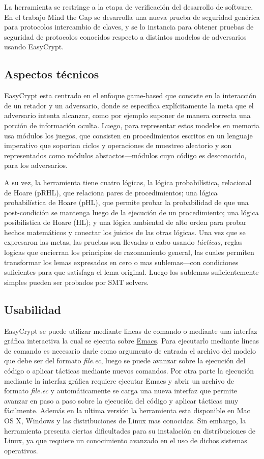 \documentclass[runningheads]{llncs}
\begin{document}
La herramienta se restringe a la etapa de verificación del desarrollo de software. En el trabajo Mind the Gap\cite{ref_article2} se desarrolla una nueva prueba de seguridad genérica para protocolos intercambio de claves, y se lo instancia para obtener pruebas de seguridad de protocolos conocidos respecto a distintos modelos de adversarios usando EasyCrypt.

\subsection{Aspectos técnicos}

EasyCrypt esta centrado en el enfoque game-based que consiste en la interacción de un retador y un adversario, donde se especifica explícitamente la meta que el adversario intenta alcanzar, como por ejemplo suponer de manera correcta una porción de información oculta. Luego, para representar estos modelos en memoria usa módulos los juegos, que consisten en procedimientos escritos en un lenguaje imperativo que soportan ciclos y operaciones de muestreo aleatorio y son representados como módulos abstactos—módulos cuyo código es desconocido, para los adversarios.

A su vez, la herramienta tiene cuatro lógicas, la lógica probabilística, relacional de Hoare (pRHL), que relaciona pares de procedimientos; una lógica probabilística de Hoare (pHL), que permite probar la probabilidad de que una post-condición se mantenga luego de la ejecución de un procedimiento; una lógica posibilistica de Hoare (HL); y una lógica ambiental de alto orden para probar hechos matemáticos y conectar los juicios de las otras lógicas. Una vez que se expresaron las metas, las pruebas son llevadas a cabo usando \textit{tácticas}, reglas logicas que encierran los principios de razonamiento general, las cuales permiten transformar los lemas expresados en cero o mas sublemas—con condiciones suficientes para que satisfaga el lema original. Luego los sublemas suficientemente simples pueden ser probados por SMT solvers.

\subsection{Usabilidad}
EasyCrypt se puede utilizar mediante lineas de comando o mediante una interfaz gráfica interactiva la cual se ejecuta sobre \href{https://www.gnu.org/software/emacs/}{Emacs}. Para ejecutarlo mediante lineas de comando es necesario darle como argumento de entrada el archivo del modelo que debe ser del formato \textit{file.ec}, luego se puede avanzar sobre la ejecución del código o aplicar tácticas mediante nuevos comandos. Por otra parte la ejecución mediante la interfaz gráfica requiere ejecutar Emacs y abrir un archivo de formato \textit{file.ec} y automáticamente se carga una nueva interfaz que permite avanzar en paso a paso sobre la ejecución del código y aplicar tácticas muy fácilmente. Además en la ultima versión la herramienta esta disponible en Mac OS X, Windows y las distribuciones de Linux mas conocidas. Sin embargo, la herramienta presenta ciertas dificultades para su instalación en distribuciones de Linux, ya que requiere un conocimiento avanzado en el uso de dichos sistemas operativos.
\end{document}
